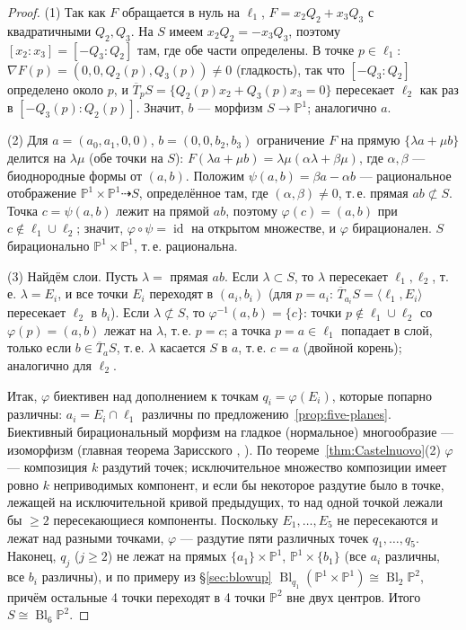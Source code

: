 \documentclass[11pt,a4paper]{article}
\theoremstyle{plain}
\theoremstyle{definition}
\theoremstyle{remark}
\newcommand{\PP}{\mathbb{P}}
\DeclareMathOperator{\Bl}{Bl}
\DeclareMathOperator{\id}{id}
\begin{document}
\begin{proof}
(1) Так как $F$ обращается в нуль на $\ell_1$, $F=x_2Q_2+x_3Q_3$ с квадратичными $Q_2,Q_3$. На $S$ имеем
$x_2Q_2=-x_3Q_3$, поэтому $[x_2:x_3]=[-Q_3:Q_2]$ там, где обе части определены. В точке $p\in\ell_1$:
$\nabla F(p)=(0,0,Q_2(p),Q_3(p))\ne0$ (гладкость), так что $[-Q_3:Q_2]$ определено около $p$, и
$\overline T_pS=\{Q_2(p)x_2+Q_3(p)x_3=0\}$ пересекает $\ell_2$ как раз в $[-Q_3(p):Q_2(p)]$. Значит, $b$ ---
морфизм $S\to\PP^1$; аналогично $a$.

(2) Для $a=(a_0,a_1,0,0)$, $b=(0,0,b_2,b_3)$ ограничение $F$ на прямую $\{\lambda a+\mu b\}$ делится на
$\lambda\mu$ (обе точки на $S$): $F(\lambda a+\mu b)=\lambda\mu(\alpha\lambda+\beta\mu)$, где $\alpha,\beta$ ---
биоднородные формы от $(a,b)$. Положим $\psi(a,b)=\beta a-\alpha b$ --- рациональное отображение
$\PP^1\times\PP^1\dashrightarrow S$, определённое там, где $(\alpha,\beta)\ne0$, т.\,е. прямая $ab\not\subset S$.
Точка $c=\psi(a,b)$ лежит на прямой $ab$, поэтому $\varphi(c)=(a,b)$ при $c\notin\ell_1\cup\ell_2$; значит,
$\varphi\circ\psi=\id$ на открытом множестве, и $\varphi$ бирационален. $S$ бирационально $\PP^1\times\PP^1$,
т.\,е. рациональна.

(3) Найдём слои. Пусть $\lambda=$ прямая $ab$. Если $\lambda\subset S$, то $\lambda$ пересекает $\ell_1,\ell_2$, т.\,е.
$\lambda=E_i$, и все точки $E_i$ переходят в $(a_i,b_i)$ (для $p=a_i$: $\overline T_{a_i}S=\langle\ell_1,E_i\rangle$
пересекает $\ell_2$ в $b_i$). Если $\lambda\not\subset S$, то $\varphi^{-1}(a,b)=\{c\}$: точки $p\notin\ell_1\cup\ell_2$
со $\varphi(p)=(a,b)$ лежат на $\lambda$, т.\,е. $p=c$; а точка $p=a\in\ell_1$ попадает в слой, только если
$b\in\overline T_aS$, т.\,е. $\lambda$ касается $S$ в $a$, т.\,е. $c=a$ (двойной корень); аналогично для $\ell_2$.

Итак, $\varphi$ биективен над дополнением к точкам $q_i=\varphi(E_i)$, которые попарно различны: $a_i=E_i\cap\ell_1$
различны по предложению~\ref{prop:five-planes}. Биективный бирациональный морфизм на гладкое (нормальное)
многообразие --- изоморфизм (главная теорема Зарисского \cite[III.9]{Sh}, \cite[III.11.4]{Ha}). По
теореме~\ref{thm:Castelnuovo}(2) $\varphi$ --- композиция $k$ раздутий точек; исключительное множество композиции
имеет ровно $k$ неприводимых компонент, и если бы некоторое раздутие было в точке, лежащей на исключительной
кривой предыдущих, то над одной точкой лежали бы $\ge2$ пересекающиеся компоненты. Поскольку $E_1,\dots,E_5$ не
пересекаются и лежат над разными точками, $\varphi$ --- раздутие пяти различных точек $q_1,\dots,q_5$.
Наконец, $q_j$ ($j\ge2$) не лежат на прямых $\{a_1\}\times\PP^1$, $\PP^1\times\{b_1\}$ (все $a_i$ различны, все $b_i$
различны), и по примеру из \S\ref{sec:blowup} $\Bl_{q_1}(\PP^1\times\PP^1)\cong\Bl_2\PP^2$, причём остальные 4
точки переходят в 4 точки $\PP^2$ вне двух центров. Итого $S\cong\Bl_6\PP^2$.
\end{proof}
\end{document}
